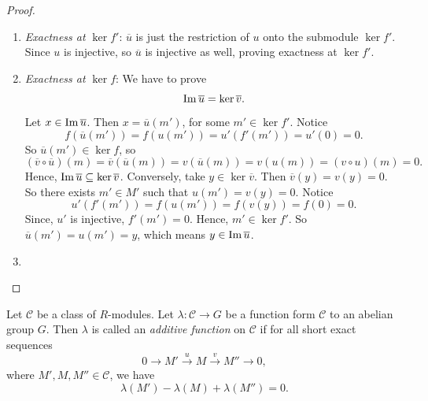 \begin{proof}
    \begin{enumerate}
        \item \emph{Exactness at} \( \ker f' \):  \( \overline{u} \) is just the restriction of \( u \) onto  the submodule \( \ker f' \). Since \( u \) is injective, so \( \overline{u} \) is injective as well, proving exactness at \( \ker f' \).
        \item  \emph{Exactness at} \( \ker f \): We have to prove 
         \[
            \operatorname{Im} \overline{u} = \ker \overline{v}.
        \]
        Let \( x \in \operatorname{Im} \overline{u} \). Then \( x = \overline{u}(m') \), for some \( m' \in \ker f' \). Notice
        \[
            f(\overline{u}(m')) = f(u(m')) = u'(f'(m')) = u'(0) = 0.  
        \]
        So \( \overline{u}(m') \in \ker f \), so 
        \[
        (\overline{v} \circ \overline{u})(m) = \overline{v}(\overline{u}(m)) = v(\overline{u}(m)) = v(u(m)) = (v \circ u)(m) = 0.
        \]
        Hence, \( \operatorname{Im} \overline{u} \subseteq \ker \overline{v} \).
        Conversely, take \( y \in \ker \overline{v} \). Then \( \overline{v}(y) = v(y) = 0 \). So there exists \( m' \in M' \) such that  \( u(m') = v(y) = 0 \). Notice
         \[
            u'(f'(m')) = f(u(m')) = f(v(y)) = f(0) = 0.
        \]
        Since, \( u' \) is injective,  \( f'(m') = 0 \). Hence,  \( m' \in \ker f' \). So  \( \overline{u}(m') =  u(m') = y\), which means \( y \in \operatorname{Im} \overline{u} \).
        \item 
    \end{enumerate}
\end{proof}
\begin{definition}
    Let \( \mathcal{C} \) be a class of \( R \)-modules. Let  \( \lambda: \mathcal{C} \to G \) be a function form \( \mathcal{C} \) to an abelian group \( G \). Then \( \lambda \) is called an  \emph{additive function} on \( \mathcal{C} \) if for all short exact sequences
    \[
        0 \to M' \xrightarrow{u} M \xrightarrow{v} M'' \to 0,
    \]
    where \( M', M, M'' \in \mathcal{C} \), we have
    \[
        \lambda(M') - \lambda(M) + \lambda(M'') = 0.
    \] 
\end{definition}
